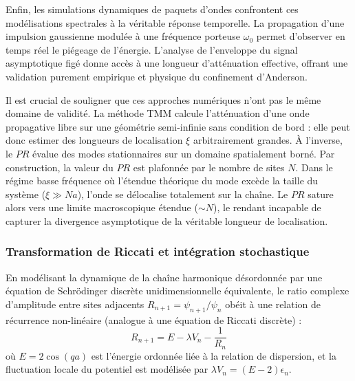 Enfin, les simulations dynamiques de paquets d'ondes confrontent ces modélisations spectrales à la véritable réponse temporelle. La propagation d'une impulsion gaussienne modulée à une fréquence porteuse $\omega_0$ permet d'observer en temps réel le piégeage de l'énergie. L'analyse de l'enveloppe du signal asymptotique figé donne accès à une longueur d'atténuation effective, offrant une validation purement empirique et physique du confinement d'Anderson.

Il est crucial de souligner que ces approches numériques n'ont pas le même domaine de validité. La méthode TMM calcule l'atténuation d'une onde propagative libre sur une géométrie semi-infinie sans condition de bord : elle peut donc estimer des longueurs de localisation $\xi$ arbitrairement grandes. À l'inverse, le $PR$ évalue des modes stationnaires sur un domaine spatialement borné. Par construction, la valeur du $PR$ est plafonnée par le nombre de sites $N$. Dans le régime basse fréquence où l'étendue théorique du mode excède la taille du système ($\xi \gg N a$), l'onde se délocalise totalement sur la chaîne. Le $PR$ sature alors vers une limite macroscopique étendue ($\sim N$), le rendant incapable de capturer la divergence asymptotique de la véritable longueur de localisation.

\subsubsection{Transformation de Riccati et intégration stochastique}\label{sec:riccati_node}
En modélisant la dynamique de la chaîne harmonique désordonnée par une équation de Schrödinger discrète unidimensionnelle équivalente, le ratio complexe d'amplitude entre sites adjacents $R_{n+1} = \psi_{n+1}/\psi_n$ obéit à une relation de récurrence non-linéaire (analogue à une équation de Riccati discrète) :
\begin{equation}
    R_{n+1} = E - \lambda V_n - \frac{1}{R_n}
    \label{eq:riccati_recurrence}
\end{equation}
où $E = 2\cos(qa)$ est l'énergie ordonnée liée à la relation de dispersion, et la fluctuation locale du potentiel est modélisée par $\lambda V_n = (E - 2)\epsilon_n$.


